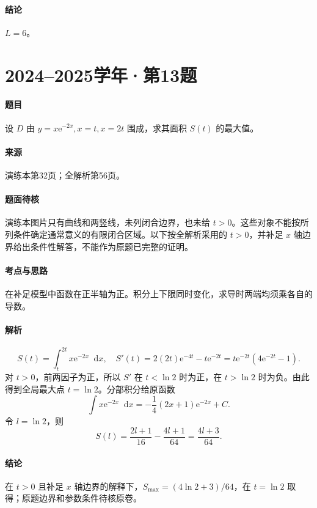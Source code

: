 \documentclass[UTF8,fontset=fandol,12pt,oneside,openany]{ctexrep}
\newcommand{\dd}{\mathop{}\!\mathrm d}
\newcommand{\ee}{\mathrm e}
\theoremstyle{definition}
\begin{document}
\paragraph{结论}$L=6$。

\par\addvspace{18pt}\noindent\begin{minipage}{\linewidth}
\section{2024--2025学年·第13题}
\paragraph{题目}设 $D$ 由 $y=x\ee^{-2x},x=t,x=2t$ 围成，求其面积 $S(t)$ 的最大值。
\paragraph{来源}演练本第32页；全解析第56页。
\paragraph{题面待核}演练本图片只有曲线和两竖线，未列闭合边界，也未给 $t>0$。这些对象不能按所列条件确定通常意义的有限闭合区域。以下按全解析采用的 $t>0$，并补足 $x$ 轴边界给出条件性解答，不能作为原题已完整的证明。
\end{minipage}\par
\paragraph{考点与思路}在补足模型中函数在正半轴为正。积分上下限同时变化，求导时两端均须乘各自的导数。
\paragraph{解析}
\[
 S(t)=\int_t^{2t}x\ee^{-2x}\dd x,
\quad S'(t)=2(2t)\ee^{-4t}-t\ee^{-2t}
 =t\ee^{-2t}(4\ee^{-2t}-1).
\]
对 $t>0$，前两因子为正，所以 $S'$ 在 $t<\ln2$ 时为正，在 $t>\ln2$ 时为负。由此得到全局最大点 $t=\ln2$。分部积分给原函数
\[
 \int x\ee^{-2x}\dd x=-\frac14(2x+1)\ee^{-2x}+C.
\]
令 $l=\ln2$，则
\[
 S(l)=\frac{2l+1}{16}-\frac{4l+1}{64}
 =\frac{4l+3}{64}.
\]
\paragraph{结论}在 $t>0$ 且补足 $x$ 轴边界的解释下，$S_{\max}=(4\ln2+3)/64$，在 $t=\ln2$ 取得；原题边界和参数条件待核原卷。
\end{document}
